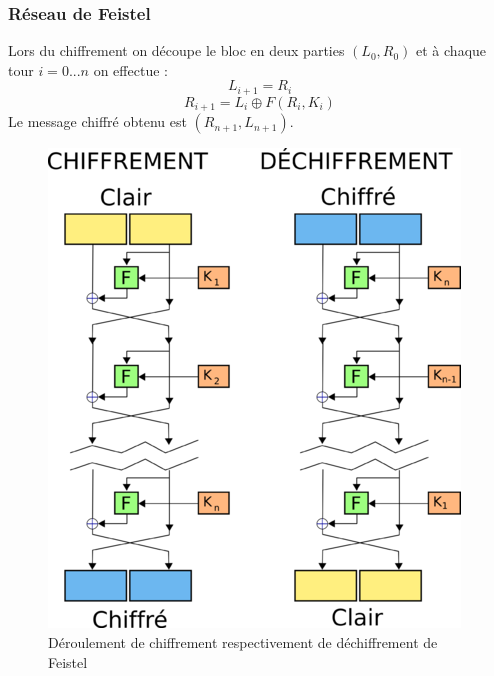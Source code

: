 \documentclass[12pt, a4paper]{article}
\begin{document}
	\subsubsection{Réseau de Feistel}
	Lors du chiffrement on découpe le bloc en deux parties \( (L_{0}, R_{0}) \) et à chaque tour \( i = 0...n \) on effectue :
	\[ L_{i+1} = R_{i} \]
	\[ R_{i+1} = L_{i} \oplus F(R_{i}, K_{i}) \]
	Le message chiffré obtenu est \( (R_{n+1}, L_{n+1}) \).
	\begin{figure}[!ht]
		\centering
		\includegraphics[scale=0.9]{images/feistel}
		\caption{Déroulement de chiffrement respectivement de déchiffrement de Feistel}
		\label{fig:feistel}
	\end{figure}
\end{document}
